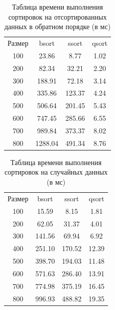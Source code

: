 \documentclass{report}
\begin{document}
\begin{table} [h!]
	\caption{Таблица времени выполнения сортировок на отсортированных данных в обратном порядке (в мс)}
	\begin{center}
	\begin{tabular}{|c c c c|}

		\hline

		Размер & bsort & ssort & qsort \\ [0.5ex]

100 & 23.86 & 8.77 & 1.02  \\ 
\hline
200 & 82.34 & 32.21 & 2.20  \\ 
\hline
300 & 188.91 & 72.18 & 3.14  \\ 
\hline
400 & 335.86 & 123.37 & 4.24  \\ 
\hline
500 & 506.64 & 201.45 & 5.43  \\ 
\hline
600 & 747.45 & 285.66 & 6.55  \\ 
\hline
700 & 989.84 & 373.37 & 8.02  \\ 
\hline
800 & 1288.04 & 491.34 & 8.76  \\ 
\hline

	\end{tabular}
	\end{center}
\end{table}

\begin{table} [h!]
	\caption{Таблица времени выполнения сортировок на случайных данных (в мс)}
	\begin{center}
	\begin{tabular}{|c c c c|}

		\hline

		Размер & bsort & ssort  & qsort \\ [0.5ex]
100 & 15.59 & 8.15 & 1.81  \\ 
\hline
200 & 62.05 & 31.37 & 4.01  \\ 
\hline
300 & 141.56 & 69.94 & 6.92  \\ 
\hline
400 & 251.10 & 170.52 & 12.39  \\ 
\hline
500 & 398.70 & 194.03 & 11.48  \\ 
\hline
600 & 571.63 & 286.40 & 13.91  \\ 
\hline
700 & 774.98 & 375.19 & 16.45  \\ 
\hline
800 & 996.93 & 488.82 & 19.35  \\ 
\hline

	\end{tabular}
	\end{center}
\end{table}
\end{document}
